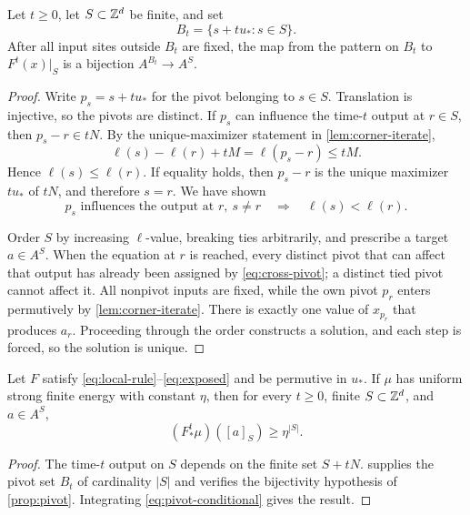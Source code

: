 \begin{lemma}\label{lem:corner-pivots}
Let $t\geq0$, let $S\subset\mathbb{Z}^d$ be finite, and set
\[
  B_t=\{s+tu_*:s\in S\}.
\]
After all input sites outside $B_t$ are fixed, the map from the pattern on
$B_t$ to $F^t(x)|_S$ is a bijection $A^{B_t}\to A^S$.
\end{lemma}

\begin{proof}
Write $p_s=s+tu_*$ for the pivot belonging to $s\in S$.  Translation is
injective, so the pivots are distinct.  If $p_s$ can influence the
time-$t$ output at $r\in S$, then
$p_s-r\in tN$.  By the unique-maximizer statement in
\cref{lem:corner-iterate},
\[
  \ell(s)-\ell(r)+tM=\ell(p_s-r)\leq tM.
\]
Hence $\ell(s)\leq\ell(r)$.  If equality holds, then $p_s-r$ is the unique
maximizer $tu_*$ of $tN$, and therefore $s=r$.  We have shown
\begin{equation}\label{eq:cross-pivot}
 p_s\text{ influences the output at }r,\ s\neq r
 \quad\Longrightarrow\quad \ell(s)<\ell(r).
\end{equation}

Order $S$ by increasing $\ell$-value, breaking ties arbitrarily, and prescribe
a target $a\in A^S$.  When the equation at $r$ is reached, every distinct
pivot that can affect that output has already been assigned by
\eqref{eq:cross-pivot}; a distinct tied pivot cannot affect it.  All
nonpivot inputs are fixed, while the own pivot $p_r$ enters permutively by
\cref{lem:corner-iterate}.  There is exactly one value of $x_{p_r}$ that
produces $a_r$.  Proceeding through the order constructs a solution, and
each step is forced, so the solution is unique.
\end{proof}

\begin{theorem}\label{thm:corner}
Let $F$ satisfy \eqref{eq:local-rule}--\eqref{eq:exposed} and be permutive in
$u_*$.  If $\mu$ has uniform strong finite energy with constant $\eta$, then
for every $t\geq0$, finite $S\subset\mathbb{Z}^d$, and $a\in A^S$,
\[
  (F^t_*\mu)([a]_S)\geq\eta^{|S|}.
\]
\end{theorem}

\begin{proof}
The time-$t$ output on $S$ depends on the finite set $S+tN$.
 supplies the pivot set $B_t$ of cardinality $|S|$
and verifies the bijectivity hypothesis of \cref{prop:pivot}.  Integrating
\eqref{eq:pivot-conditional} gives the result.
\end{proof}

